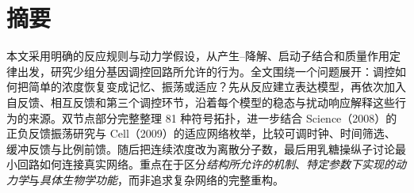 \maketitle\setcounter{page}{2}
\chapter*{摘要}
本文采用明确的反应规则与动力学假设，从产生--降解、启动子结合和质量作用定律出发，研究少组分基因调控回路所允许的行为。全文围绕一个问题展开：调控如何把简单的浓度恢复变成记忆、振荡或适应？先从反应建立表达模型，再依次加入自反馈、相互反馈和第三个调控环节，沿着每个模型的稳态与扰动响应解释这些行为的来源。双节点部分完整整理 81 种符号拓扑，进一步结合 Science（2008）的正负反馈振荡研究与 Cell（2009）的适应网络枚举，比较可调时钟、时间筛选、缓冲反馈与比例前馈。随后把连续浓度改为离散分子数，最后用乳糖操纵子讨论最小回路如何连接真实网络。重点在于区分\emph{结构所允许的机制}、\emph{特定参数下实现的动力学}与\emph{具体生物学功能}，而非追求复杂网络的完整重构。

\clearpage{\footnotesize\linespread{.93}\selectfont\setlength{\parskip}{0pt}\tableofcontents}\clearpage
